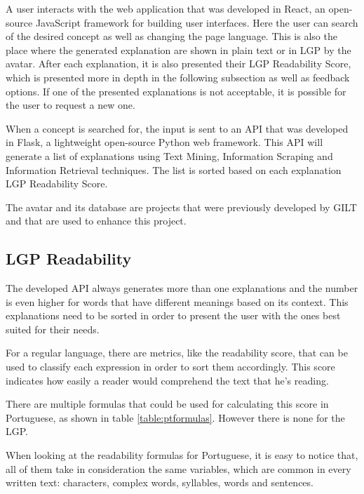 \documentclass[runningheads]{llncs}
\begin{document}
A user interacts with the web application that was developed in React, an open-source JavaScript framework for building user interfaces.
Here the user can search of the desired concept as well as changing the page language.
This is also the place where the generated explanation are shown in plain text or in LGP by the avatar.
After each explanation, it is also presented their LGP Readability Score, which is presented more in depth in the following subsection as well as feedback options.
If one of the presented explanations is not acceptable, it is possible for the user to request a new one.

When a concept is searched for, the input is sent to an API that was developed in Flask, a lightweight open-source Python web framework.
This API will generate a list of explanations using Text Mining, Information Scraping and Information Retrieval techniques.
The list is sorted based on each explanation LGP Readability Score.

The avatar and its database are projects that were previously developed by GILT and that are used to enhance this project.

%

\subsection{LGP Readability}

The developed API always generates more than one explanations and the number is even higher for words that have different meanings based on its context.
This explanations need to be sorted in order to present the user with the ones best suited for their needs.

For a regular language, there are metrics, like the readability score, that can be used to classify each expression in order to sort them accordingly.
This score indicates how easily a reader would comprehend the text that he's reading.

There are multiple formulas that could be used for calculating this score in Portuguese, as shown in table \ref{table:ptformulas}.
However there is none for the LGP.

When looking at the readability formulas for Portuguese, it is easy to notice that, all of them take in consideration the same variables, which are common in every written text: characters, complex words, syllables, words and sentences.
\end{document}
